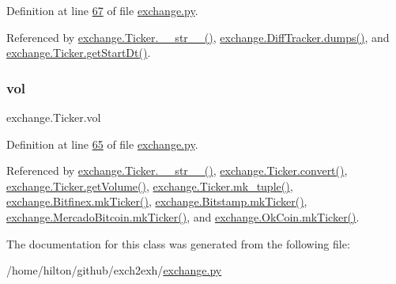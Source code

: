 Definition at line \hyperlink{exchange_8py_source_l00067}{67} of file \hyperlink{exchange_8py_source}{exchange.\+py}.



Referenced by \hyperlink{exchange_8py_source_l00136}{exchange.\+Ticker.\+\_\+\+\_\+str\+\_\+\+\_\+()}, \hyperlink{exchange_8py_source_l00385}{exchange.\+Diff\+Tracker.\+dumps()}, and \hyperlink{exchange_8py_source_l00118}{exchange.\+Ticker.\+get\+Start\+Dt()}.

\mbox{\label{classexchange_1_1_ticker_a24c0dd396aebc54c06e429a68c964ea3}} 
\subsubsection{\texorpdfstring{vol}{vol}}
{\footnotesize\ttfamily exchange.\+Ticker.\+vol}



Definition at line \hyperlink{exchange_8py_source_l00065}{65} of file \hyperlink{exchange_8py_source}{exchange.\+py}.



Referenced by \hyperlink{exchange_8py_source_l00136}{exchange.\+Ticker.\+\_\+\+\_\+str\+\_\+\+\_\+()}, \hyperlink{exchange_8py_source_l00069}{exchange.\+Ticker.\+convert()}, \hyperlink{exchange_8py_source_l00115}{exchange.\+Ticker.\+get\+Volume()}, \hyperlink{exchange_8py_source_l00121}{exchange.\+Ticker.\+mk\+\_\+tuple()}, \hyperlink{exchange_8py_source_l00453}{exchange.\+Bitfinex.\+mk\+Ticker()}, \hyperlink{exchange_8py_source_l00525}{exchange.\+Bitstamp.\+mk\+Ticker()}, \hyperlink{exchange_8py_source_l00665}{exchange.\+Mercado\+Bitcoin.\+mk\+Ticker()}, and \hyperlink{exchange_8py_source_l00730}{exchange.\+Ok\+Coin.\+mk\+Ticker()}.



The documentation for this class was generated from the following file\+:\begin{DoxyCompactItemize}
\item 
/home/hilton/github/exch2exh/\hyperlink{exchange_8py}{exchange.\+py}\end{DoxyCompactItemize}
